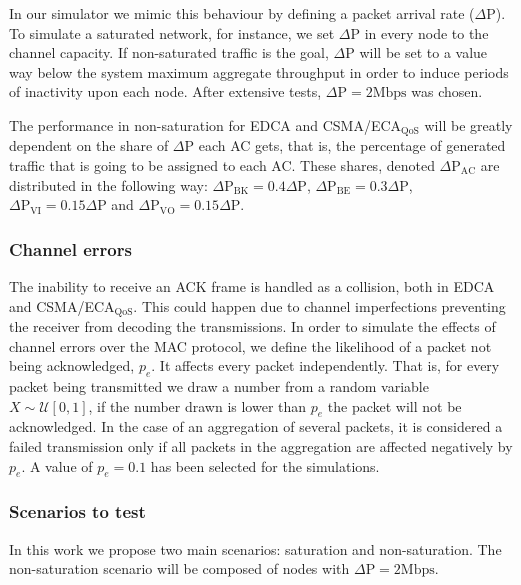 In our simulator we mimic this behaviour by defining a packet arrival rate ($\Delta\text{P}$). To simulate a saturated network, for instance, we set $\Delta\text{P}$ in every node to the channel capacity. If non-saturated traffic is the goal, $\Delta\text{P}$ will be set to a value way below the system maximum aggregate throughput in order to induce periods of inactivity upon each node. After extensive tests, $\Delta\text{P}=2\text{Mbps}$ was chosen.

The performance in non-saturation for EDCA and CSMA/ECA$_{\text{QoS}}$ will be greatly dependent on the share of $\Delta\text{P}$ each AC gets, that is, the percentage of generated traffic that is going to be assigned to each AC. These shares, denoted $\Delta\text{P}_{\text{AC}}$ are distributed in the following way: $\Delta\text{P}_{\text{BK}}=0.4\Delta\text{P}$, $\Delta\text{P}_{\text{BE}}=0.3\Delta\text{P}$, $\Delta\text{P}_{\text{VI}}=0.15\Delta\text{P}$ and $\Delta\text{P}_{\text{VO}}=0.15\Delta\text{P}$.

	
\subsubsection{Channel errors}
The inability to receive an ACK frame is handled as a collision, both in EDCA and CSMA/ECA$_{\text{QoS}}$. This could happen due to channel imperfections preventing the receiver from decoding the transmissions. In order to simulate the effects of channel errors over the MAC protocol, we define the likelihood of a packet not being acknowledged, $p_e$. It affects every packet independently. That is, for every packet being transmitted we draw a number from a random variable $X\sim\mathcal{U}[0,1]$, if the number drawn is lower than $p_e$ the packet will not be acknowledged. In the case of an aggregation of several packets, it is considered a failed transmission only if all packets in the aggregation are affected negatively by $p_e$. A value of $p_e=0.1$ has been selected for the simulations.

\subsubsection{Scenarios to test}
In this work we propose two main scenarios: saturation and non-saturation. The non-saturation scenario will be composed of nodes with $\Delta\text{P}=2\text{Mbps}$.


